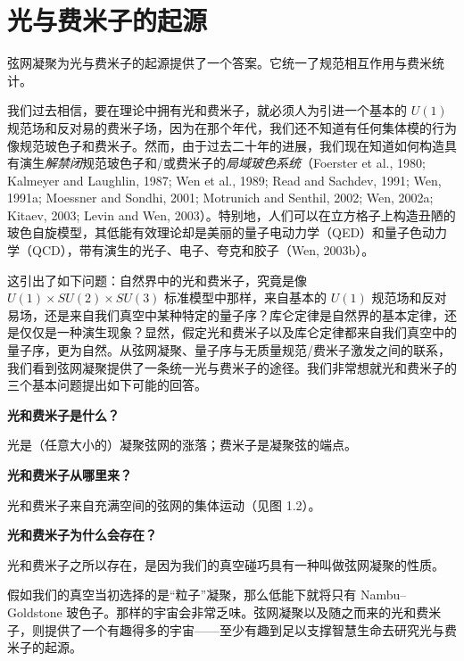 \section{光与费米子的起源}

\begin{keypoints}
\item 弦网凝聚为光与费米子的起源提供了一个答案。它统一了规范相互作用与费米统计。
\end{keypoints}


我们过去相信，要在理论中拥有光和费米子，就必须人为引进一个基本的 $U(1)$ 规范场和反对易的费米子场，因为在那个年代，我们还不知道有任何集体模的行为像规范玻色子和费米子。然而，由于过去二十年的进展，我们现在知道如何构造具有演生\emph{解禁闭}规范玻色子和/或费米子的\emph{局域玻色系统}（Foerster et al., 1980; Kalmeyer and Laughlin, 1987; Wen et al., 1989; Read and Sachdev, 1991; Wen, 1991a; Moessner and Sondhi, 2001; Motrunich and Senthil, 2002; Wen, 2002a; Kitaev, 2003; Levin and Wen, 2003）。特别地，人们可以在立方格子上构造丑陋的玻色自旋模型，其低能有效理论却是美丽的量子电动力学（QED）和量子色动力学（QCD），带有演生的光子、电子、夸克和胶子（Wen, 2003b）。

这引出了如下问题：自然界中的光和费米子，究竟是像 $U(1)\times SU(2)\times SU(3)$ 标准模型中那样，来自基本的 $U(1)$ 规范场和反对易场，还是来自我们真空中某种特定的量子序？库仑定律是自然界的基本定律，还是仅仅是一种演生现象？显然，假定光和费米子以及库仑定律都来自我们真空中的量子序，更为自然。从弦网凝聚、量子序与无质量规范/费米子激发之间的联系，我们看到弦网凝聚提供了一条统一光与费米子的途径。我们非常想就光和费米子的三个基本问题提出如下可能的回答。

\textbf{光和费米子是什么？}

光是（任意大小的）凝聚弦网的涨落；费米子是凝聚弦的端点。

\textbf{光和费米子从哪里来？}

光和费米子来自充满空间的弦网的集体运动（见图 1.2）。

\textbf{光和费米子为什么会存在？}

光和费米子之所以存在，是因为我们的真空碰巧具有一种叫做弦网凝聚的性质。

假如我们的真空当初选择的是“粒子”凝聚，那么低能下就将只有 Nambu–Goldstone 玻色子。那样的宇宙会非常乏味。弦网凝聚以及随之而来的光和费米子，则提供了一个有趣得多的宇宙——至少有趣到足以支撑智慧生命去研究光与费米子的起源。

